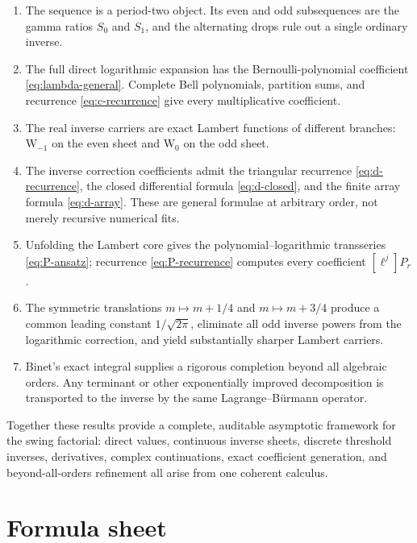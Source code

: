 \documentclass[11pt,a4paper]{article}
\theoremstyle{clean}
\theoremstyle{definition}
\newcommand{\W}{\mathrm W}
\newcommand{\Coeff}[2]{\left[#1\right]#2}
\begin{document}
\begin{enumerate}
\item The sequence is a period-two object.  Its even and odd subsequences are the gamma ratios \(S_0\) and \(S_1\), and the alternating drops rule out a single ordinary inverse.
\item The full direct logarithmic expansion has the Bernoulli-polynomial coefficient \cref{eq:lambda-general}.  Complete Bell polynomials, partition sums, and recurrence \cref{eq:c-recurrence} give every multiplicative coefficient.
\item The real inverse carriers are exact Lambert functions of different branches: \(\W_{-1}\) on the even sheet and \(\W_0\) on the odd sheet.
\item The inverse correction coefficients admit the triangular recurrence \cref{eq:d-recurrence}, the closed differential formula \cref{eq:d-closed}, and the finite array formula \cref{eq:d-array}.  These are general formulae at arbitrary order, not merely recursive numerical fits.
\item Unfolding the Lambert core gives the polynomial--logarithmic transseries \cref{eq:P-ansatz}; recurrence \cref{eq:P-recurrence} computes every coefficient \(\Coeff{\ell^j}{P_r}\).
\item The symmetric translations \(m\mapsto m+1/4\) and \(m\mapsto m+3/4\) produce a common leading constant \(1/\sqrt{2\pi}\), eliminate all odd inverse powers from the logarithmic correction, and yield substantially sharper Lambert carriers.
\item Binet's exact integral supplies a rigorous completion beyond all algebraic orders.  Any terminant or other exponentially improved decomposition is transported to the inverse by the same Lagrange--B\"urmann operator.
\end{enumerate}

Together these results provide a complete, auditable asymptotic framework for the swing factorial: direct values, continuous inverse sheets, discrete threshold inverses, derivatives, complex continuations, exact coefficient generation, and beyond-all-orders refinement all arise from one coherent calculus.

\appendix

\section{Formula sheet}
\label{app:formula-sheet}
\end{document}
